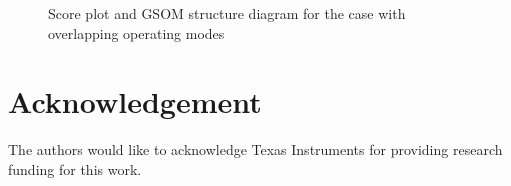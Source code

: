 \documentclass[review,3p]{elsarticle}
\renewcommand\[{\begin{equation}}
\renewcommand\]{\end{equation}}
\begin{document}
\begin{figure}[htpb]
  \centering
  \caption{Score plot and GSOM structure diagram for the case with overlapping operating modes}
  \label{fig:gsmmsfig5}
\end{figure}



\clearpage

%

\newpage

\section{Acknowledgement}
The authors would like to acknowledge Texas Instruments for providing research funding for this work.
\end{document}
